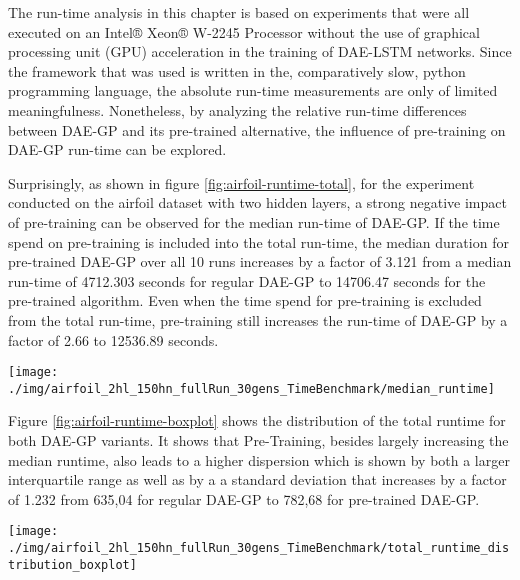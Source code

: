 \documentclass[
  11pt,
]{article}
\let\origfigure\figure
\let\endorigfigure\endfigure
\renewenvironment{figure}[1][2] {
    \expandafter\origfigure\expandafter[H]
} {
    \endorigfigure
}
\begin{document}
The run-time analysis in this chapter is based on experiments that were all executed on an Intel® Xeon® W-2245 Processor without the use of graphical processing unit (GPU) acceleration in the training of DAE-LSTM networks.
Since the framework that was used is written in the, comparatively slow, python programming language, the absolute run-time measurements are only of limited meaningfulness.
Nonetheless, by analyzing the relative run-time differences between DAE-GP and its pre-trained alternative, the influence of pre-training on DAE-GP run-time can be explored.

Surprisingly, as shown in figure \ref{fig:airfoil-runtime-total}, for the experiment conducted on the airfoil dataset with two hidden layers, a strong negative impact of pre-training can be observed for the median run-time of DAE-GP.
If the time spend on pre-training is included into the total run-time, the median duration for pre-trained DAE-GP over all 10 runs increases by a factor of 3.121 from a median run-time of 4712.303 seconds for regular DAE-GP to 14706.47 seconds for the pre-trained algorithm.
Even when the time spend for pre-training is excluded from the total run-time, pre-training still increases the run-time of DAE-GP by a factor of 2.66 to 12536.89 seconds.

\begin{figure}[c]

{\centering \texttt{[image: ./img/airfoil\_2hl\_150hn\_fullRun\_30gens\_TimeBenchmark/median\_runtime]} 

}

\caption{Median Runtime - Airfoil}\label{fig:airfoil-runtime-total}
\end{figure}

Figure \ref{fig:airfoil-runtime-boxplot} shows the distribution of the total runtime for both DAE-GP variants.
It shows that Pre-Training, besides largely increasing the median runtime, also leads to a higher dispersion which is shown by both a larger interquartile range as well as by a a standard deviation that increases by a factor of 1.232 from 635,04 for regular DAE-GP to 782,68 for pre-trained DAE-GP.

\begin{figure}[c]

{\centering \texttt{[image: ./img/airfoil\_2hl\_150hn\_fullRun\_30gens\_TimeBenchmark/total\_runtime\_distribution\_boxplot]} 

}

\caption{Total Runtime Boxplot - Airfoil}\label{fig:airfoil-runtime-boxplot}
\end{figure}
\end{document}
